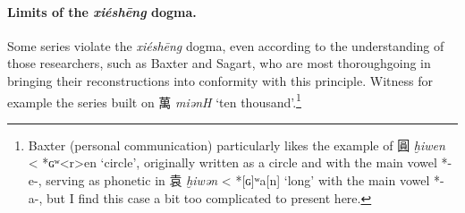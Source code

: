 \paragraph{Limits of the \textit{xiéshēng} dogma.}
Some series violate the \textit{xiéshēng} dogma, even according to the understanding of those   researchers, such as Baxter and Sagart, who are most thoroughgoing in bringing their reconstructions into conformity with this principle. Witness for example the series built on 
萬 %
     \textit{miənH} `ten thousand'.\footnote{Baxter (personal communication) particularly likes the example of 圓  \textit{ḫiwen} <   *ɢʷ<r>en  `circle', originally written as a circle and with the main vowel *-e-, serving as phonetic in 袁 \textit{ḫiwən} < *[ɢ]ʷa[n] `long' with the main vowel *-a-, but I find this case a bit too complicated to present here.} 


